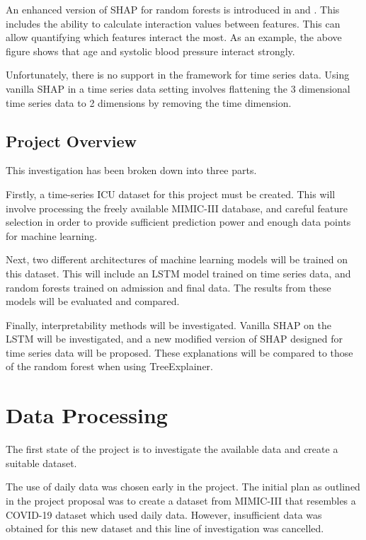 \documentclass[12pt]{article}
\begin{document}
An enhanced version of SHAP for random forests is introduced in \cite{TreeExplainer} and \cite{SHAPInteraction}. This includes the ability to calculate interaction values between features. This can allow quantifying which features interact the most. As an example, the above figure shows that age and systolic blood pressure interact strongly.

Unfortunately, there is no support in the framework for time series data. Using vanilla SHAP in a time series data setting involves flattening the 3 dimensional time series data to 2 dimensions by removing the time dimension. 

\subsection{Project Overview}

This investigation has been broken down into three parts. 

Firstly, a time-series ICU dataset for this project must be created. This will involve processing the freely available MIMIC-III database, and careful feature selection in order to provide sufficient prediction power and enough data points for machine learning. 

Next, two different architectures of machine learning models will be trained on this dataset. This will include an LSTM model trained on time series data, and random forests trained on admission and final data. The results from these models will be evaluated and compared. 

Finally, interpretability methods will be investigated. Vanilla SHAP on the LSTM will be investigated, and a new modified version of SHAP designed for time series data will be proposed. These explanations will be compared to those of the random forest when using TreeExplainer. 

\section{Data Processing}

The first state of the project is to investigate the available data and create a suitable dataset. 

The use of daily data was chosen early in the project. The initial plan as outlined in the project proposal was to create a dataset from MIMIC-III that resembles a COVID-19 dataset which used daily data. However, insufficient data was obtained for this new dataset and this line of investigation was cancelled.
\end{document}
